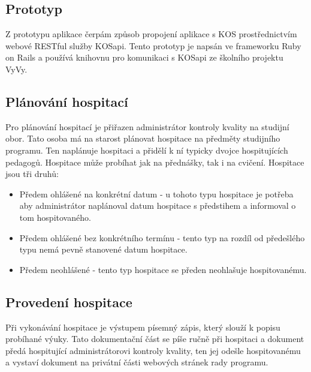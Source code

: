 \subsection{Prototyp}
Z prototypu aplikace čerpám způsob propojení aplikace s KOS prostřednictvím webové RESTful služby KOSapi. Tento prototyp je napsán ve frameworku Ruby on Rails a používá knihovnu pro komunikaci s KOSapi ze školního projektu VyVy.

\subsection{Plánování hospitací}
Pro plánování hospitací je přiřazen administrátor kontroly kvality na studijní obor. Tato osoba má na starost plánovat hospitace na předměty studijního programu. Ten naplánuje hospitaci a přidělí k ní typicky dvojce hospitujících pedagogů. Hospitace může probíhat jak na přednášky, tak i na cvičení. Hospitace jsou tři druhů:

\begin{itemize}
\item Předem ohlášené na konkrétní datum - u tohoto typu hospitace je potřeba aby administrátor naplánoval datum hospitace s předstihem a informoval o tom hospitovaného.
\item Předem ohlášené bez konkrétního termínu - tento typ na rozdíl od předešlého typu nemá pevně stanovené datum hospitace. 
\item Předem neohlášené - tento typ hospitace se předen neohlašuje hospitovanému. 
\end{itemize}

\subsection{Provedení hospitace}
Při vykonávání hospitace je výstupem písemný zápis, který slouží k popisu probíhané výuky. Tato dokumentační část se píše ručně při hospitaci a dokument předá hospitující administrátorovi kontroly kvality, ten jej odešle hospitovanému a vystaví dokument na privátní části webových stránek rady programu.

